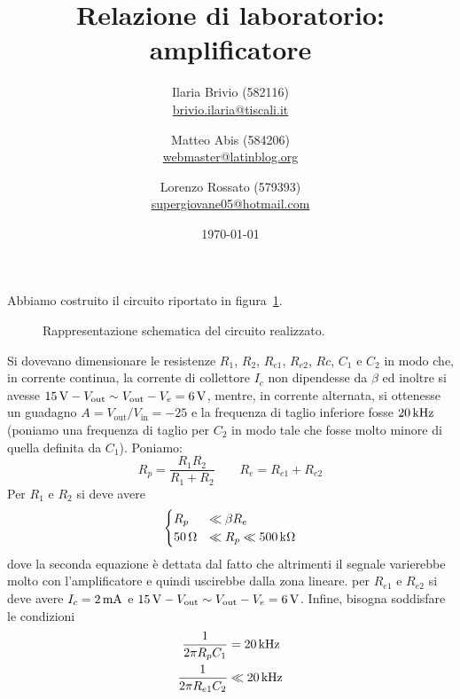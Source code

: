 \documentclass[italian,a4paper]{article}
\begin{document}
\title{Relazione di laboratorio: amplificatore}
\author{\normalsize Ilaria Brivio (582116)\\%
\normalsize \url{brivio.ilaria@tiscali.it}%
\and %
\normalsize Matteo Abis (584206)\\ %
\normalsize \url{webmaster@latinblog.org}
\and %
\normalsize Lorenzo Rossato (579393)\\ %
\normalsize \url{supergiovane05@hotmail.com}}
\date{\today}
\maketitle
\noindent
Abbiamo costruito il circuito riportato in figura~\ref{fig:circuito}.
\begin{figure}[h]\caption{Rappresentazione schematica del circuito
    realizzato.}\label{fig:circuito}
    \centering
    
\end{figure}
Si dovevano dimensionare le resistenze $R_1$, $R_2$, $R_{e1}$, $R_{e2}$,
$Rc$, $C_1$ e $C_2$
in modo che, in corrente continua, la corrente di collettore $I_c$ non
dipendesse da $\beta$ ed inoltre si avesse $\unit[15]{V}-V_{\text{out}} \sim V_{\text{out}}-
V_e = \unit[6]{V}$, mentre, in corrente alternata, si ottenesse un guadagno
$A={V_\text{out}}/{V_\text{in}}=-25$ e la frequenza di taglio inferiore fosse
$\unit[20]{kHz}$ (poniamo una frequenza di taglio per $C_2$ in modo tale che
fosse molto minore di quella definita da $C_1$).
Poniamo:
\begin{equation*}
     R_p= \dfrac{R_1 R_2}{R_1+R_2} \qquad R_e =R_{e1}+R_{e2}
\end{equation*}
Per $R_1$ e $R_2$ si deve avere
\begin{equation*}
    \begin{cases}
  R_p &\ll \beta R_e\\   
  \unit[50]{\ohm} &\ll R_p \ll \unit[500]{k\ohm} \\   
    \end{cases}
\end{equation*}
dove la seconda equazione è dettata dal fatto che altrimenti il segnale
varierebbe molto con l'amplificatore e quindi uscirebbe dalla zona
lineare.
per $R_{e1}$ e $R_{e2}$ si deve avere 
$I_c = \unit[2]{mA}$ e $\unit[15]{V}-V_{\text{out}} \sim
V_{\text{out}}- V_e = \unit[6]{V}$.
Infine, bisogna soddisfare le condizioni
\begin{align*}
  \frac{1}{2\pi R_p C_1} &= \unit[20]{kHz}\\  
 \frac{1}{2 \pi R_{e1} C_2} &\ll \unit[20]{kHz}\\
\end{align*}
\end{document}
